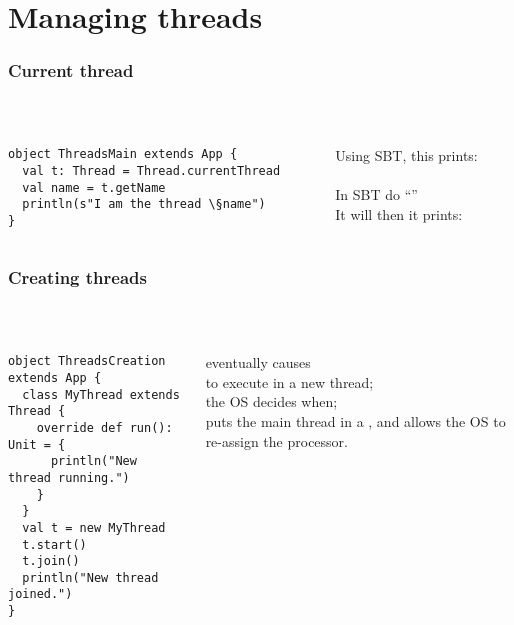 \documentclass[aspectratio=169]{beamer}
\begin{document}
\section{Managing threads}

\begin{frame}[fragile]\frametitle{Current thread}
~\\[-8mm]
\begin{columns}
\begin{column}{0.49\textwidth}
\begin{lstlisting}
object ThreadsMain extends App {
  val t: Thread = Thread.currentThread
  val name = t.getName
  println(s"I am the thread \§name")
}
\end{lstlisting}
\end{column}
\begin{column}{0.49\textwidth}
Using SBT, this prints:
\\
\\[4mm]
In SBT do ``''
\\
It will then it prints:
\\
\end{column}
\end{columns}
\end{frame}


\begin{frame}[fragile]\frametitle{Creating threads}
~\\[-8mm]
\begin{columns}
\begin{column}{0.49\textwidth}
\begin{lstlisting}[emph={start,join,run}]
object ThreadsCreation extends App {
  class MyThread extends Thread {
    override def run(): Unit = {
      println("New thread running.")
    }
  } 
  val t = new MyThread
  t.start()
  t.join()
  println("New thread joined.")
}
\end{lstlisting}
\end{column}
\begin{column}{0.49\textwidth}
\alert{} eventually causes
\\\alert{} to execute in a new thread;
\\[4mm]
the OS decides when;
\\[4mm]
\alert{} puts the main thread in a , and allows the OS to re-assign the processor.
\end{column}
\end{columns}
\end{frame}
\end{document}
